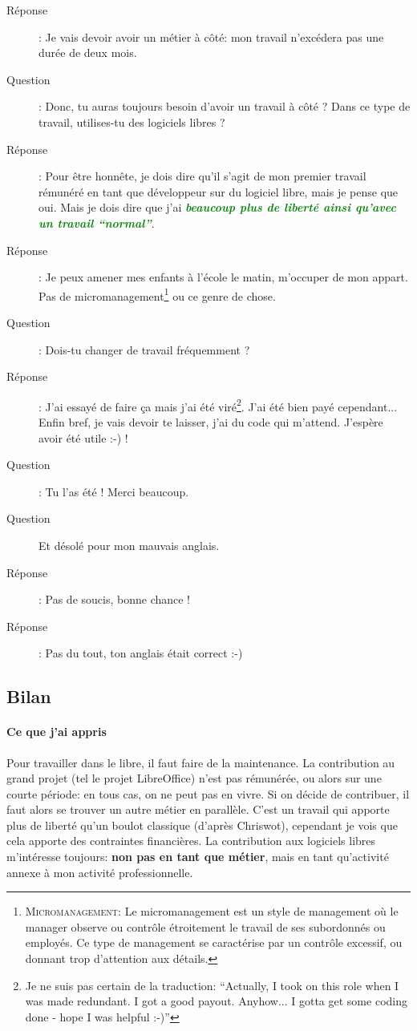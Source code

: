 \documentclass[a4paper,12pt, draft]{report}
\newcommand{\goodPoint}[1]{\textcolor{green}{\textbf{\textit{#1}}}}
\begin{document}
\begin{description}
\item [Réponse]:  Je vais devoir avoir un métier à côté: mon travail n'excédera pas une durée de deux mois. 
\item [Question]:  Donc, tu auras toujours besoin d'avoir un travail à côté ? Dans ce type de travail, utilises-tu des logiciels libres ?
\item [Réponse]:  Pour être honnête, je dois dire qu'il s'agit de mon premier travail rémunéré en tant que développeur sur du logiciel libre, mais je pense que oui. Mais je dois dire que j'ai \goodPoint{beaucoup plus de liberté ainsi qu'avec un travail ``normal''}.
\item [Réponse]:  Je peux amener mes enfants à l'école le matin, m'occuper de mon appart. Pas de micromanagement\footnote{\textsc{Micromanagement}: Le micromanagement est un style de management où le manager observe ou contrôle étroitement le travail de ses subordonnés ou employés. Ce type de management se caractérise par un contrôle excessif, ou donnant trop d'attention aux détails.} ou ce genre de chose.
\item [Question]:  Dois-tu changer de travail fréquemment ?
\item [Réponse]:  J'ai essayé de faire ça mais j'ai été viré\footnote{Je ne suis pas certain de la traduction: ``Actually, I took on this role when I was made redundant. I got a good payout. Anyhow... I gotta get some coding done - hope I was helpful :-)''}. J'ai été bien payé cependant... Enfin bref, je vais devoir te laisser, j'ai du code qui m'attend. J'espère avoir été utile :-) !
\item [Question]:  Tu l'as été ! Merci beaucoup.
\item [Question] Et désolé pour mon mauvais anglais.
\item [Réponse]:  Pas de soucis, bonne chance !
\item [Réponse]:  Pas du tout, ton anglais était correct :-)

\end{description}





\subsection{Bilan}
\paragraph{Ce que j'ai appris}
Pour travailler dans le libre, il faut faire de la maintenance.
La contribution au grand projet (tel le projet LibreOffice) n'est pas rémunérée, ou alors sur une courte période: en tous cas, on ne peut pas en vivre. Si on décide de contribuer, il faut alors se trouver un autre métier en parallèle.
C'est un travail qui apporte plus de liberté qu'un boulot classique (d'après Chriswot), cependant je vois que cela apporte des contraintes financières.
La contribution aux logiciels libres m'intéresse toujours: \textbf{non pas en tant que métier}, mais en tant qu'activité annexe à mon activité professionnelle.
\end{document}
